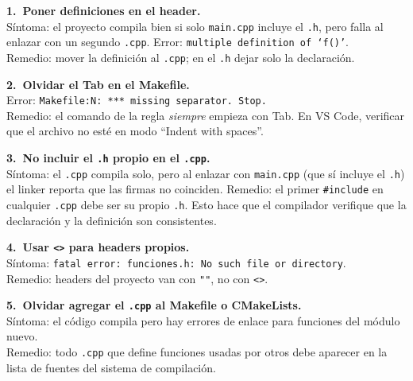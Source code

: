 \documentclass[12pt, oneside]{article}
\begin{document}
\begin{notaprofesor}

  \textbf{1.\ Poner definiciones en el header.}\\
  Síntoma: el proyecto compila bien si solo \texttt{main.cpp} incluye el
  \texttt{.h}, pero falla al enlazar con un segundo \texttt{.cpp}.
  Error: \texttt{multiple definition of `f()'}.\\
  Remedio: mover la definición al \texttt{.cpp}; en el \texttt{.h}
  dejar solo la declaración.

  \vspace{0.5em}
  \textbf{2.\ Olvidar el Tab en el Makefile.}\\
  Error: \texttt{Makefile:N: *** missing separator.  Stop.}\\
  Remedio: el comando de la regla \textit{siempre} empieza con Tab.
  En VS Code, verificar que el archivo no esté en modo ``Indent with
  spaces''.

  \vspace{0.5em}
  \textbf{3.\ No incluir el \texttt{.h} propio en el \texttt{.cpp}.}\\
  Síntoma: el \texttt{.cpp} compila solo, pero al enlazar con \texttt{main.cpp}
  (que sí incluye el \texttt{.h}) el linker reporta que las firmas no coinciden.
  Remedio: el primer \texttt{\#include} en cualquier \texttt{.cpp} debe ser
  su propio \texttt{.h}.  Esto hace que el compilador verifique que la
  declaración y la definición son consistentes.

  \vspace{0.5em}
  \textbf{4.\ Usar \texttt{<>} para headers propios.}\\
  Síntoma: \texttt{fatal error: funciones.h: No such file or directory}.\\
  Remedio: headers del proyecto van con \texttt{""}, no con \texttt{<>}.

  \vspace{0.5em}
  \textbf{5.\ Olvidar agregar el \texttt{.cpp} al Makefile o CMakeLists.}\\
  Síntoma: el código compila pero hay errores de enlace para funciones del
  módulo nuevo.\\
  Remedio: todo \texttt{.cpp} que define funciones usadas por otros debe
  aparecer en la lista de fuentes del sistema de compilación.

\end{notaprofesor}

\end{document}

